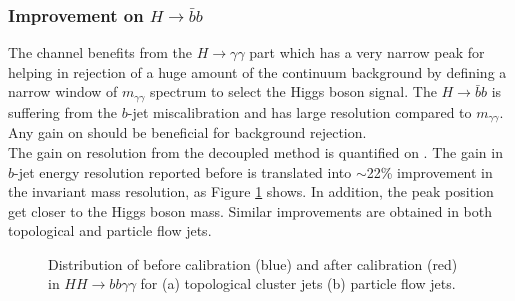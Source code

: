 \subsubsection{Improvement on $H\rightarrow\bar{b}b$}
The \HHyybb channel benefits from the $H\rightarrow\gamma\gamma$ part which has a very narrow peak for \myy helping in rejection of a huge amount of the continuum background by defining a narrow window of $m_{\gamma\gamma}$ spectrum to select the Higgs boson signal. The $H\rightarrow\bar{b}b$ is suffering from the $b$-jet miscalibration and has large \mbb resolution compared to $m_{\gamma\gamma}$. Any gain on \mbb should be beneficial for background rejection.\\
The gain on \mbb resolution from the decoupled method is quantified on \HHyybb. The gain in $b$-jet energy resolution reported before is translated into $\sim$22\% improvement in the \mbb invariant mass resolution, as Figure \ref{fig:Jet:Cal:BCal:Result:mbb} shows. In addition, the \mbb peak position get closer to the Higgs boson mass. Similar improvements are obtained in both topological and particle flow jets. \\
\begin{figure}[htbp]
   \centering
   \quad
   \begin{tcolorbox}[colback=black!5!white,colframe=white!75!black]
   \caption{Distribution of \mbb before calibration (blue) and after calibration (red) in $HH\rightarrow bb\gamma\gamma$ for (a) topological cluster jets (b) particle flow jets.}
   \label{fig:Jet:Cal:BCal:Result:mbb}
   \end{tcolorbox}
\end{figure}
\\

